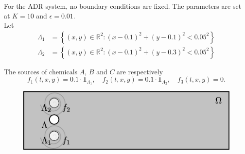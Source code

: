 \documentclass{beamer}
\theoremstyle{definition}
\theoremstyle{remark}
\theoremstyle{example}
\newif\ifinsection
\newif\ifinsubsection
\newcommand {\aframe}[1] {
  \begin{frame}
    \ifinsection\frametitle{\secname}\fi
    \ifinsubsection\framesubtitle{\subsecname}\fi
  #1
  \end{frame}
}
\begin{document}
\aframe{
  For the ADR system, no boundary conditions are fixed. The parameters are set
  at $K=10$ and $\epsilon=0.01$.\\\vspace{0.5cm}\pause
  Let
  \begin{align*}
    \Lambda_1&=\left\{(x,y)\in\mathbb{R}^2:(x-0.1)^2+(y-0.1)^2<0.05^2\right\}\\
    \Lambda_2&=\left\{(x,y)\in\mathbb{R}^2:(x-0.1)^2+(y-0.3)^2<0.05^2\right\}
  \end{align*}

  The sources of chemicals $A$, $B$ and $C$ are respectively
  \[
  f_1(t,x,y)=0.1\cdot\pmb{1}_{\Lambda_1},\quad f_2(t,x,y)=0.1\cdot\pmb{1}_{\Lambda_2},
    \quad f_3(t,x,y)=0.
  \]
  \begin{figure}
    \centering
    \includegraphics[scale=1]{figs/region2.pdf}
  \end{figure}
}
\end{document}
